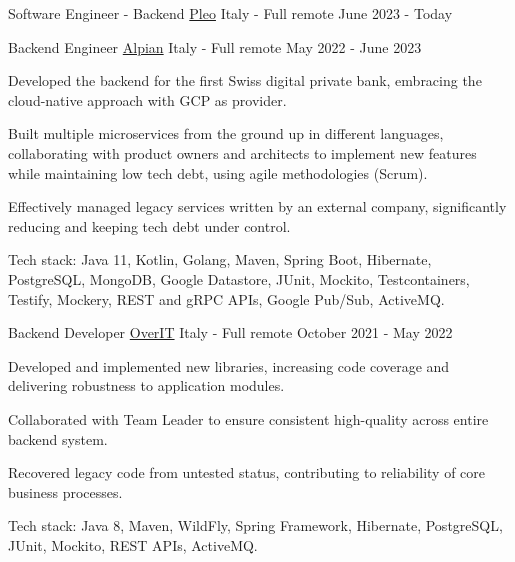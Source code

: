 

\begin{cventries}

\cventry
{Software Engineer - Backend} %
{\href{https://pleo.io/}{Pleo}} %
{Italy - Full remote} %
{June 2023 - Today} %
{}

	
\cventry
{Backend Engineer} %
{\href{https://alpian.com/}{Alpian}} %
{Italy - Full remote} %
{May 2022 - June 2023} %
{
	\begin{cvitems}
		\item {Developed the backend for the first Swiss digital private bank, embracing the cloud-native approach with GCP as provider.}
		\item {Built multiple microservices from the ground up in different languages, collaborating with product owners and architects to implement new features while maintaining low tech debt, using agile methodologies (Scrum).}
		\item {Effectively managed legacy services written by an external company, significantly reducing and keeping tech debt under control.}
		\item {Tech stack: Java 11, Kotlin, Golang, Maven, Spring Boot, Hibernate, PostgreSQL, MongoDB, Google Datastore, JUnit, Mockito, Testcontainers, Testify, Mockery, REST and gRPC APIs, Google Pub/Sub, ActiveMQ.}
	\end{cvitems}
}


\cventry
	{Backend Developer} %
	{\href{https://overit.it/en}{OverIT}} %
	{Italy - Full remote} %
	{October 2021 - May 2022} %
	{
		\begin{cvitems}
			\item {Developed and implemented new libraries, increasing code coverage and delivering robustness to application modules.}
			\item {Collaborated with Team Leader to ensure consistent high-quality across entire backend system.}
			\item {Recovered legacy code from untested status, contributing to reliability of core business processes.}
			\item {Tech stack: Java 8, Maven, WildFly, Spring Framework, Hibernate, PostgreSQL, JUnit, Mockito, REST APIs, ActiveMQ.}
		\end{cvitems}
	}


\end{cventries}
